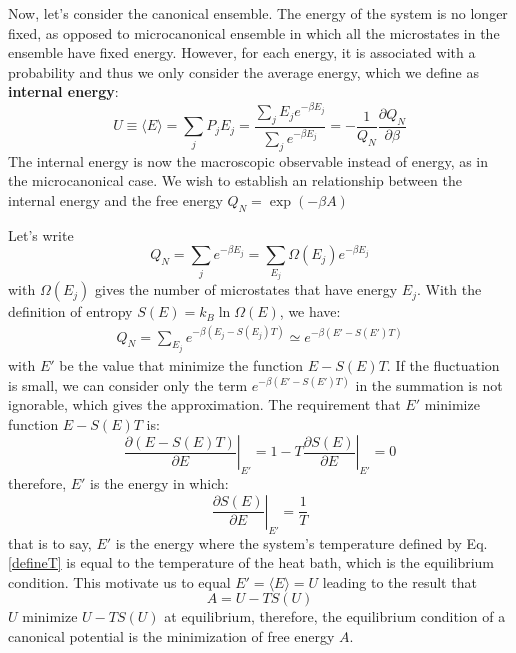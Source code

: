 \documentclass{article}
\begin{document}
Now, let's consider the canonical ensemble. The energy of the system
is no longer fixed, as opposed to microcanonical ensemble in which all the 
microstates in the ensemble have fixed energy. 
However, for each energy, it is associated with a 
probability and thus we only consider the average energy, which we define
as \textbf{internal energy}:
\begin{equation}
    U \equiv \langle E \rangle = \sum_j P_j E_j = \frac{\sum_j E_j e^{-\beta E_j}}{\sum_j e^{-\beta E_j}} = -\frac{1}{Q_N} \frac{\partial Q_N}{\partial \beta}
\end{equation}
The internal energy is now the macroscopic observable instead of energy, as
in the microcanonical case.
We wish to establish an relationship between the internal energy and 
the free energy $Q_N = \exp(-\beta A)$

Let's write
\begin{equation}
    Q_N = \sum_j e^{-\beta E_j} = \sum_{E_j} \Omega(E_j) e^{-\beta E_j}
\end{equation}
with $\Omega(E_j)$ gives the number of microstates that have energy $E_j$. With the definition of entropy $S(E) = k_B \ln \Omega(E)$, we have:
\begin{eqnarray}
    Q_N = \sum_{E_j} e^{-\beta (E_j - S(E_j)T)} \simeq e^{-\beta (E' - S(E')T)} \label{approx}
\end{eqnarray}
with $E'$ be the value that minimize the function $E - S(E)T$. If the fluctuation is small, we can consider only
the term $e^{-\beta (E' - S(E')T)}$ in the summation is not ignorable, which gives the approximation.
The requirement that $E'$ minimize function $E - S(E)T$ is:
\begin{equation}
    \left. \frac{\partial (E-S(E)T)}{\partial E}\right|_{E'} = \left. 1 - T\frac{\partial S(E)}{\partial E}\right|_{E'} = 0
\end{equation}
therefore, $E'$ is the energy in which:
\begin{equation}
    \left. \frac{\partial S(E)}{\partial E}\right|_{E'} = \frac{1}{T}
\end{equation}
that is to say, $E'$ is the energy where the 
system's temperature defined by Eq.\ref{defineT} is equal to
the temperature of the heat bath, which is the equilibrium condition. 
This motivate us to equal $E' = \langle E \rangle = U$
leading to the result that 
\begin{equation}
    A = U - TS(U) \label{eqA}
\end{equation}
$U$ minimize $U - TS(U)$ at equilibrium, therefore, the equilibrium condition of 
a canonical potential is the minimization of free energy $A$.
\end{document}
